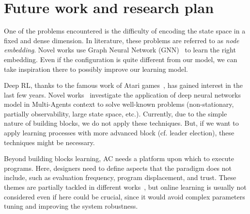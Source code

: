\documentclass[conference]{IEEEtran}
\begin{document}
\section{Future work and research plan}
One of the problems encountered is the difficulty of encoding the state space in a fixed and dense dimension. 
%
%
In literature, these problems are referred to as \emph{node embedding}. 
%
%
Novel works use Graph Neural Network (GNN)~\cite{DBLP:journals/tnn/ScarselliGTHM09} to learn the right embedding.
%
Even if the configuration is quite different from our model, we can take inspiration there to possibly improve our learning model.

Deep RL, thanks to the famous work of Atari games~\cite{DBLP:journals/corr/HosuR16}, has gained interest in the last few years. 
%
Novel works~\cite{DBLP:journals/aamas/Hernandez-LealK19} investigate the application of deep neural networks model in Multi-Agents context to solve well-known problems (non-stationary, partially observability, large state space, etc.). 
%
Currently, due to the simple nature of building blocks, we do not apply these techniques. But, if we want to apply learning processes with more advanced block (cf. leader election), these techniques might be necessary.
%
%

Beyond building blocks learning, AC needs a platform upon which to execute programs. 
%
Here, designers need to define aspects that the paradigm does not include, such as evaluation frequency, program displacement, and trust.
% 
These themes are partially tackled in different works~\cite{DBLP:journals/scp/CasadeiAV18, DBLP:journals/fi/CasadeiPPVW20, DBLP:journals/corr/abs-2012-13806}, but online learning is usually not considered even if here could be crucial, since it would avoid complex parameters tuning and improving the system robustness.
%
\end{document}
